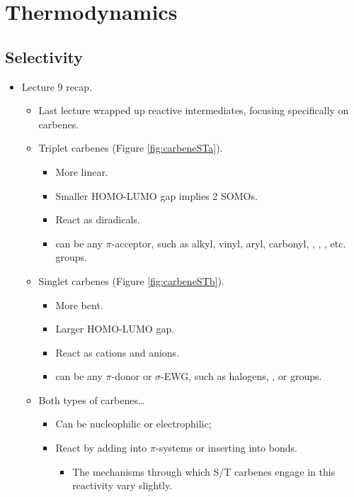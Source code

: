\documentclass[../notes.tex]{subfiles}
\begin{document}
\chapter{Thermodynamics}
\section{Selectivity}
\begin{itemize}
    \item {}Lecture 9 recap.
    \begin{itemize}
        \item Last lecture wrapped up reactive intermediates, focusing specifically on carbenes.
        \item Triplet carbenes (Figure \ref{fig:carbeneSTa}).
        \begin{itemize}
            \item More linear.
            \item Smaller HOMO-LUMO gap implies 2 SOMOs.
            \item React as diradicals.
            \item {} can be any $\pi$-acceptor, such as alkyl, vinyl, aryl, carbonyl, , , , etc. groups.
        \end{itemize}
        \item Singlet carbenes (Figure \ref{fig:carbeneSTb}).
        \begin{itemize}
            \item More bent.
            \item Larger HOMO-LUMO gap.
            \item React as cations and anions.
            \item {} can be any $\pi$-donor or $\sigma$-EWG, such as halogens, , or  groups.
        \end{itemize}
        \item Both types of carbenes\dots
        \begin{itemize}
            \item Can be nucleophilic or electrophilic;
            \item React by adding into $\pi$-systems or inserting into bonds.
            \begin{itemize}
                \item The mechanisms through which S/T carbenes engage in this reactivity vary slightly.
            \end{itemize}

\end{itemize}
\end{itemize}
\end{itemize}
\end{document}
